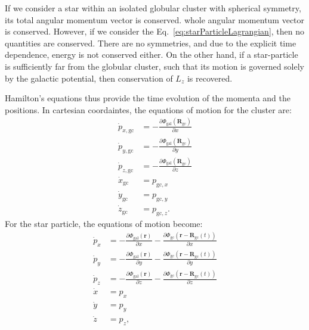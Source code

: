         If we consider a star within an isolated globular cluster with spherical symmetry, its total angular momentum vector is conserved. whole angular momentum vector is conserved. However, if we consider the Eq.~\ref{eq:starParticleLagrangian}, then no quantities are conserved. There are no symmetries, and due to the explicit time dependence, energy is not conserved either. On the other hand, if a star-particle is sufficiently far from the globular cluster, such that its motion is governed solely by the galactic potential, then conservation of $L_z$ is recovered. 

        Hamilton's equations thus provide the time evolution of the momenta and the positions. In cartesian coordaintes, the equations of motion for the cluster are: 
        \begin{equation}\label{eq:equations_of_motion_cluster}
            \begin{aligned}
                \dot{p}_{x,\mathrm{gc}} &= -\frac{\partial \Phi_\mathrm{gal}\left(\mathbf{R}_{\mathrm{gc}}\right)}{\partial x} \\
                \dot{p}_{y,\mathrm{gc}} &= -\frac{\partial \Phi_\mathrm{gal}\left(\mathbf{R}_{\mathrm{gc}}\right)}{\partial y} \\
                \dot{p}_{z,\mathrm{gc}} &= -\frac{\partial \Phi_\mathrm{gal}\left(\mathbf{R}_{\mathrm{gc}}\right)}{\partial z} \\
                \dot{x}_{\mathrm{gc}} &= p_{\mathrm{gc},x} \\
                \dot{y}_{\mathrm{gc}} &= p_{\mathrm{gc},y} \\
                \dot{z}_{\mathrm{gc}} &= p_{\mathrm{gc},z}.
            \end{aligned}
        \end{equation}
        For the star particle, the equations of motion become: 
        \begin{equation}\label{eq:equations_of_motion_stream}
            \begin{aligned}
                \dot{p}_{x} &= -\frac{\partial \Phi_\mathrm{gal}\left(\mathbf{r}\right)}{\partial x} - \frac{\partial \Phi_\mathrm{gc}\left(\mathbf{r} - \mathbf{R}_{\mathrm{gc}}(t)\right)}{\partial x}\\
                \dot{p}_{y} &= -\frac{\partial \Phi_\mathrm{gal}\left(\mathbf{r}\right)}{\partial y} - \frac{\partial \Phi_\mathrm{gc}\left(\mathbf{r} - \mathbf{R}_{\mathrm{gc}}(t)\right)}{\partial y}\\
                \dot{p}_{z} &= -\frac{\partial \Phi_\mathrm{gal}\left(\mathbf{r}\right)}{\partial z} - \frac{\partial \Phi_\mathrm{gc}\left(\mathbf{r} - \mathbf{R}_{\mathrm{gc}}(t)\right)}{\partial z}\\
                \dot{x} &= p_x \\
                \dot{y} &= p_y \\
                \dot{z} &= p_z,
            \end{aligned}
        \end{equation} 
